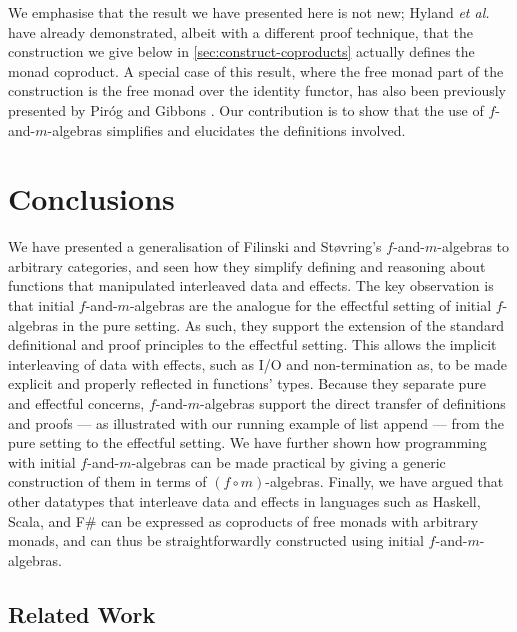\documentclass{jfp1}
\begin{document}
We emphasise that the result we have presented here is not new; Hyland
\emph{et al.} have already demonstrated, albeit with a different proof
technique, that the construction we give below in
\autoref{sec:construct-coproducts} actually defines the monad
coproduct. A special case of this result, where the free monad part of
the construction is the free monad over the identity functor, has also
been previously presented by Pir{\'o}g and Gibbons
\cite{pirog12tracing}. Our contribution is to show that the use of
$f$-and-$m$-algebras simplifies and elucidates the definitions
involved.

\section{Conclusions}
\label{sec:conclusions}

We have presented a generalisation of Filinski and St\o{}vring's
$f$-and-$m$-algebras to arbitrary categories, and seen how they
simplify defining and reasoning about functions that manipulated
interleaved data and effects. The key observation is that initial
$f$-and-$m$-algebras are the analogue for the effectful setting of
initial $f$-algebras in the pure setting. As such, they support the
extension of the standard definitional and proof principles to the
effectful setting. This allows the implicit interleaving of data with
effects, such as I/O and non-termination as, to be made explicit and
properly reflected in functions' types. Because they separate pure and
effectful concerns, $f$-and-$m$-algebras support the direct transfer
of definitions and proofs --- as illustrated with our running example
of list append --- from the pure setting to the effectful setting. We
have further shown how programming with initial $f$-and-$m$-algebras
can be made practical by giving a generic construction of them in
terms of $(f \circ m)$-algebras. Finally, we have argued that other
datatypes that interleave data and effects in languages such as
Haskell, Scala, and F\# can be expressed as coproducts of free monads
with arbitrary monads, and can thus be straightforwardly constructed
using initial $f$-and-$m$-algebras.

\subsection{Related Work}
\end{document}
